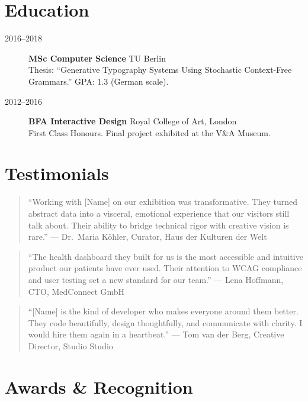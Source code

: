 \documentclass[
    language=english,
    doctype=personal-portfolio,
    institution=none,
]{../../omnilatex}
\begin{document}
\section{Education}

\begin{description}
    \item[2016--2018] \textbf{MSc Computer Science} \hfill TU Berlin \\
    Thesis: ``Generative Typography Systems Using Stochastic Context-Free Grammars.''
    GPA: 1.3 (German scale).

    \item[2012--2016] \textbf{BFA Interactive Design} \hfill Royal College of Art, London \\
    First Class Honours. Final project exhibited at the V&A Museum.
\end{description}

\section{Testimonials}

\begin{quote}
``Working with [Name] on our exhibition was transformative. They turned abstract data into a visceral, emotional experience that our visitors still talk about. Their ability to bridge technical rigor with creative vision is rare.''
\hfill --- Dr.\ Maria K\"{o}hler, Curator, Haus der Kulturen der Welt
\end{quote}

\begin{quote}
``The health dashboard they built for us is the most accessible and intuitive product our patients have ever used. Their attention to WCAG compliance and user testing set a new standard for our team.''
\hfill --- Lena Hoffmann, CTO, MedConnect GmbH
\end{quote}

\begin{quote}
``[Name] is the kind of developer who makes everyone around them better. They code beautifully, design thoughtfully, and communicate with clarity. I would hire them again in a heartbeat.''
\hfill --- Tom van der Berg, Creative Director, Studio Studio
\end{quote}

\section{Awards \& Recognition}
\end{document}
